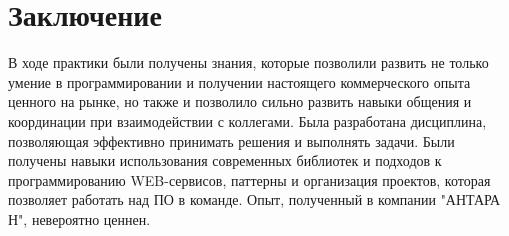 \documentclass[a4paper,14pt]{extarticle}
\begin{document}
\section{Заключение}
В ходе практики были получены знания, которые позволили развить не только умение в программировании и получении 
настоящего коммерческого опыта ценного на рынке, но также и позволило сильно развить навыки общения и координации 
при взаимодействии с коллегами. Была разработана дисциплина, позволяющая эффективно 
принимать решения и выполнять задачи. 
Были получены навыки использования современных библиотек и подходов к программированию WEB-сервисов, паттерны и 
организация проектов, которая позволяет работать над ПО в команде.
Опыт, полученный в компании "АНТАРА Н", невероятно ценнен. 
\end{document}
